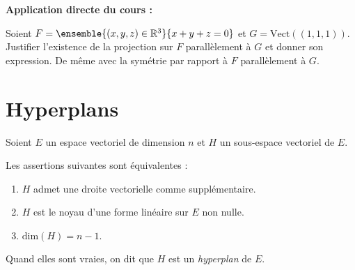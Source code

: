 \documentclass[french,11pt,twoside]{VcCours}
\newenvironment{ApplicationDirecte}{\textbf{Application directe du cours :}

}{}
\begin{document}
\begin{ApplicationDirecte} Soient $F=\ensemble{(x,y,z) \in \mathbb{R}^3}{x+y+z =0}$ 
	et $G= \textrm{Vect}((1,1,1))$. Justifier l'existence de la projection 
	sur $F$ parallèlement à $G$ et donner son expression. De même avec 
	la symétrie par rapport à $F$ parallèlement à $G$. \end{ApplicationDirecte}

\section{Hyperplans}

\begin{Theoreme}{} 
Soient $E$ un espace vectoriel de dimension $n$ et $H$ un sous-espace vectoriel 
de $E$. 

Les assertions suivantes sont équivalentes :
\begin{enumerate}
\item $H$ admet une droite vectorielle comme supplémentaire.
\item $H$ est le noyau d'une forme linéaire sur $E$ non nulle.
\item $\textrm{dim}(H)=n-1$.
\end{enumerate}
Quand elles sont vraies, on dit que $H$ est un \emph{hyperplan} de $E$.
\end{Theoreme}
\end{document}
